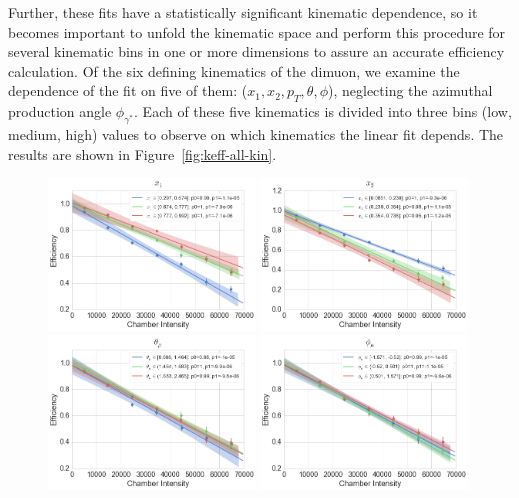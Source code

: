 Further, these fits have a statistically significant kinematic dependence, so it becomes important to unfold the kinematic space and perform this procedure for several kinematic bins in one or more dimensions to assure an accurate efficiency calculation. Of the six defining kinematics of the dimuon, we examine the dependence of the fit on five of them: ($x_1, x_2, p_T, \theta, \phi$), neglecting the azimuthal production angle $\phi_{\gamma^*}$. Each of these five kinematics is divided into three bins (low, medium, high) values to observe on which kinematics the linear fit depends. The results are shown in Figure~\ref{fig:keff-all-kin}.
\begin{figure}
\centering
\includegraphics[width=0.49\textwidth]{figures/analysis/x1-keff-int.png}
\includegraphics[width=0.49\textwidth]{figures/analysis/x2-keff-int.png} \\
\includegraphics[width=0.49\textwidth]{figures/analysis/theta-keff-int.png}
\includegraphics[width=0.49\textwidth]{figures/analysis/phi-keff-int.png} \\

\end{figure}
